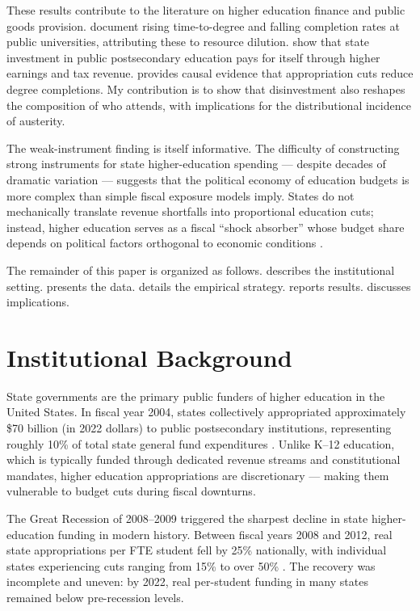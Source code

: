 \documentclass[12pt]{article}
\begin{document}
These results contribute to the literature on higher education finance and public goods provision. \citet{bound2007cohort} document rising time-to-degree and falling completion rates at public universities, attributing these to resource dilution. \citet{deming2017growing} show that state investment in public postsecondary education pays for itself through higher earnings and tax revenue. \citet{turner2017effect} provides causal evidence that appropriation cuts reduce degree completions. My contribution is to show that disinvestment also reshapes the composition of who attends, with implications for the distributional incidence of austerity.

The weak-instrument finding is itself informative. The difficulty of constructing strong instruments for state higher-education spending --- despite decades of dramatic variation --- suggests that the political economy of education budgets is more complex than simple fiscal exposure models imply. States do not mechanically translate revenue shortfalls into proportional education cuts; instead, higher education serves as a fiscal ``shock absorber'' whose budget share depends on political factors orthogonal to economic conditions \citep{delaney2011state, okunade2004economics}.

The remainder of this paper is organized as follows.  describes the institutional setting.  presents the data.  details the empirical strategy.  reports results.  discusses implications.

\section{Institutional Background}
\label{sec:background}

State governments are the primary public funders of higher education in the United States. In fiscal year 2004, states collectively appropriated approximately \$70 billion (in 2022 dollars) to public postsecondary institutions, representing roughly 10\% of total state general fund expenditures \citep{sheeo2023shef}. Unlike K--12 education, which is typically funded through dedicated revenue streams and constitutional mandates, higher education appropriations are discretionary --- making them vulnerable to budget cuts during fiscal downturns.

The Great Recession of 2008--2009 triggered the sharpest decline in state higher-education funding in modern history. Between fiscal years 2008 and 2012, real state appropriations per FTE student fell by 25\% nationally, with individual states experiencing cuts ranging from 15\% to over 50\% \citep{sheeo2023shef}. The recovery was incomplete and uneven: by 2022, real per-student funding in many states remained below pre-recession levels.
\end{document}
